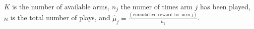 $K$ is the number of available arms, $n_j$ the numer of times arm $j$ has 
been played, $n$ is the total number of plays, and $\hat{\mu}_j 
=\frac{(\text{cumulative reward for arm j})}{n_j}$.


% 
% 
% 
% 
% 
% 
